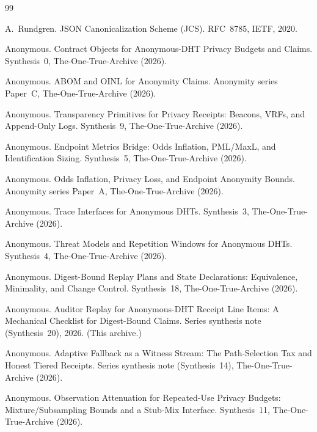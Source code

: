 \documentclass[11pt]{article}
\begin{document}
\begin{thebibliography}{99}\small


A.~Rundgren.
\newblock JSON Canonicalization Scheme (JCS).
\newblock RFC~8785, IETF, 2020.

Anonymous.
\newblock Contract Objects for Anonymous-DHT Privacy Budgets and Claims.
\newblock Synthesis~0, The-One-True-Archive (2026).

Anonymous.
\newblock ABOM and OINL for Anonymity Claims.
\newblock Anonymity series Paper~C, The-One-True-Archive (2026).

Anonymous.
\newblock Transparency Primitives for Privacy Receipts: Beacons, VRFs, and Append-Only Logs.
\newblock Synthesis~9, The-One-True-Archive (2026).

Anonymous.
\newblock Endpoint Metrics Bridge: Odds Inflation, PML/MaxL, and Identification Sizing.
\newblock Synthesis~5, The-One-True-Archive (2026).

Anonymous.
\newblock Odds Inflation, Privacy Loss, and Endpoint Anonymity Bounds.
\newblock Anonymity series Paper~A, The-One-True-Archive (2026).

Anonymous.
\newblock Trace Interfaces for Anonymous DHTs.
\newblock Synthesis~3, The-One-True-Archive (2026).

Anonymous.
\newblock Threat Models and Repetition Windows for Anonymous DHTs.
\newblock Synthesis~4, The-One-True-Archive (2026).

Anonymous.
\newblock Digest-Bound Replay Plans and State Declarations: Equivalence, Minimality, and Change Control.
\newblock Synthesis~18, The-One-True-Archive (2026).

Anonymous.
\newblock Auditor Replay for Anonymous-DHT Receipt Line Items: A Mechanical Checklist for Digest-Bound Claims.
\newblock Series synthesis note (Synthesis~20), 2026. (This archive.)

Anonymous.
\newblock Adaptive Fallback as a Witness Stream: The Path-Selection Tax and Honest Tiered Receipts.
\newblock Series synthesis note (Synthesis~14), The-One-True-Archive (2026).

Anonymous.
\newblock Observation Attenuation for Repeated-Use Privacy Budgets: Mixture/Subsampling Bounds and a Stub-Mix Interface.
\newblock Synthesis~11, The-One-True-Archive (2026).


\end{thebibliography}
\end{document}
